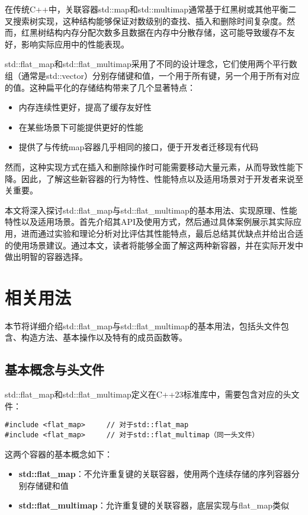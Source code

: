 \documentclass[a4paper, 12pt]{article}
\begin{document}
在传统C++中，关联容器std::map和std::multimap通常基于红黑树或其他平衡二叉搜索树实现，这种结构能够保证对数级别的查找、插入和删除时间复杂度。然而，红黑树结构内存分配次数多且数据在内存中分散存储，这可能导致缓存不友好，影响实际应用中的性能表现。

std::flat\_map和std::flat\_multimap采用了不同的设计理念，它们使用两个平行数组（通常是std::vector）分别存储键和值，一个用于所有键，另一个用于所有对应的值。这种扁平化的存储结构带来了几个显著特点：
\begin{itemize}
    \setlength{\itemsep}{0pt}
    \setlength{\parsep}{0pt}
    \setlength{\parskip}{0pt}
    \item 内存连续性更好，提高了缓存友好性
    \item 在某些场景下可能提供更好的性能
    \item 提供了与传统map容器几乎相同的接口，便于开发者迁移现有代码
\end{itemize}

然而，这种实现方式在插入和删除操作时可能需要移动大量元素，从而导致性能下降。因此，了解这些新容器的行为特性、性能特点以及适用场景对于开发者来说至关重要。

本文将深入探讨std::flat\_map与std::flat\_multimap的基本用法、实现原理、性能特性以及适用场景。首先介绍其API及使用方式，然后通过具体案例展示其实际应用，进而通过实验和理论分析对比评估其性能特点，最后总结其优缺点并给出合适的使用场景建议。通过本文，读者将能够全面了解这两种新容器，并在实际开发中做出明智的容器选择。

\section{相关用法}

本节将详细介绍std::flat\_map与std::flat\_multimap的基本用法，包括头文件包含、构造方法、基本操作以及特有的成员函数等。

\subsection{基本概念与头文件}

std::flat\_map和std::flat\_multimap定义在C++23标准库中，需要包含对应的头文件：

\begin{lstlisting}[style=cpp]
#include <flat_map>     // 对于std::flat_map
#include <flat_map>     // 对于std::flat_multimap（同一头文件）
\end{lstlisting}

这两个容器的基本概念如下：
\begin{itemize}
    \setlength{\itemsep}{0pt}
    \setlength{\parsep}{0pt}
    \setlength{\parskip}{0pt}
    \item \textbf{std::flat\_map}：不允许重复键的关联容器，使用两个连续存储的序列容器分别存储键和值
    \item \textbf{std::flat\_multimap}：允许重复键的关联容器，底层实现与flat\_map类似
\end{itemize}
\end{document}
